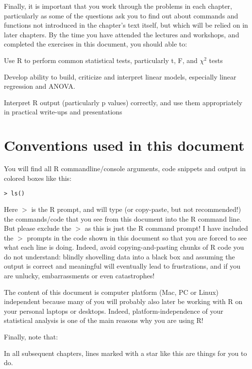 Finally, it is important that you work through the problems in each 
chapter, particularly as some of the questions ask you to find out 
about commands and functions not introduced in the chapter's text 
itself, but which will be relied on in later chapters. By the time you 
have attended the lectures and workshops, and completed the exercises 
in this document, you should able to: 
\begin{compactitem}\itemsep4pt
    \item Use {R} to perform common statistical tests, particularly t, 
    F, and $\chi^{2}$ tests
    \item Develop ability to build, criticize and interpret linear 
    models, especially linear regression and ANOVA. 
    \item Interpret R output (particularly p values) correctly, and use 
    them appropriately in practical write-ups and presentations
\end{compactitem} 

\section{Conventions used in this document}

\noindent You will find all R commandline/console arguments, code  
snippets and output in colored boxes like this:
\begin{lstlisting}
> ls()
\end{lstlisting}
Here $>$ is the R prompt, and will type (or copy-paste, but not 
recommended!) the commands/code that you see from this document into 
the R command line. But please exclude the $>$ as this is just the R 
command prompt! I have included the $>$ prompts in the code shown in 
this document so that you are forced to see what each line is doing. 
Indeed, avoid copying-and-pasting chunks of R code you do not 
understand: blindly shovelling data into a black box and assuming the 
output is correct and meaningful will eventually lead to frustrations, 
and if you are unlucky, embarrassments or even catastrophes!

The content of this document is computer platform (Mac, PC or Linux) 
independent because many of you will probably also later be working 
with R on your personal laptops or desktops. Indeed, 
platform-independence of your statistical analysis is one of the main 
reasons why you are using R! 

Finally, note that:
\begin{compactitem}[$\quad\star$]\itemsep4pt
	\item In all subsequent chapters, lines marked with a star like this 
	are things for you to do.
\end{compactitem}

